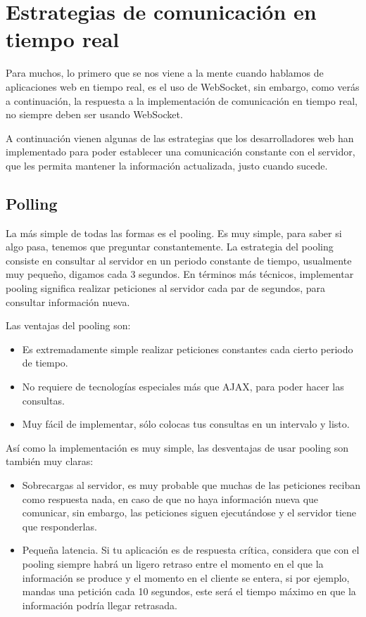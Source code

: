 \section{Estrategias de comunicación en tiempo real}

Para muchos, lo primero que se nos viene a la mente cuando hablamos de aplicaciones web en tiempo real, es el uso de WebSocket, sin embargo, como verás a continuación, la respuesta a la implementación de comunicación en tiempo real, no siempre deben ser usando WebSocket.

A continuación vienen algunas de las estrategias que los desarrolladores web han implementado para poder establecer una comunicación constante con el servidor, que les permita mantener la información actualizada, justo cuando sucede.

\subsection{Polling}

La más simple de todas las formas es el pooling. Es muy simple, para saber si algo pasa, tenemos que preguntar constantemente. La estrategia del pooling consiste en consultar al servidor en un periodo constante de tiempo, usualmente muy pequeño, digamos cada 3 segundos. En términos más técnicos, implementar pooling significa realizar peticiones al servidor cada par de segundos, para consultar información nueva.

Las ventajas del pooling son:

\begin{itemize}
  \item Es extremadamente simple realizar peticiones constantes cada cierto periodo de tiempo.
  \item No requiere de tecnologías especiales más que AJAX, para poder hacer las consultas.
  \item Muy fácil de implementar, sólo colocas tus consultas en un intervalo y listo.
\end{itemize}

Así como la implementación es muy simple, las desventajas de usar pooling son también muy claras:

\begin{itemize}
  \item Sobrecargas al servidor, es muy probable que muchas de las peticiones reciban como respuesta nada, en caso de que no haya información nueva que comunicar, sin embargo, las peticiones siguen ejecutándose y el servidor tiene que responderlas.
  \item Pequeña latencia. Si tu aplicación es de respuesta crítica, considera que con el pooling siempre habrá un ligero retraso entre el momento en el que la información se produce y el momento en el cliente se entera, si por ejemplo, mandas una petición cada 10 segundos, este será el tiempo máximo en que la información podría llegar retrasada.
\end{itemize}

